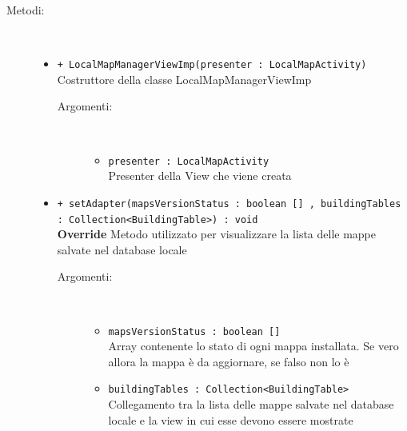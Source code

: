 \documentclass[../DefinizioneDiProdotto.tex]{subfiles}
\begin{document}
\begin{description}
\begin{itemize}
	\end{itemize}
	\item[Metodi:] \
	\begin{itemize}
		\item \texttt{+ LocalMapManagerViewImp(presenter : LocalMapActivity)}\\
		Costruttore della classe LocalMapManagerViewImp
		\begin{description}
			\item[Argomenti:] \
			\begin{itemize}
				\item \texttt{presenter : LocalMapActivity}\\
				Presenter della View che viene creata\end{itemize}
		\end{description}
		\item \texttt{+ setAdapter(mapsVersionStatus : boolean [] , buildingTables : Collection<BuildingTable>) : void}\\
		\textbf{Override} Metodo utilizzato per visualizzare la lista delle mappe salvate nel database locale
		\begin{description}
			\item[Argomenti:] \
			\begin{itemize}
				\item \texttt{mapsVersionStatus : boolean [] }\\
				Array contenente lo stato di ogni mappa installata. Se vero allora la mappa è da aggiornare, se falso non lo è\item \texttt{buildingTables : Collection<BuildingTable>}\\
				Collegamento tra la lista delle mappe salvate nel database locale e la view in cui esse devono essere mostrate\end{itemize}
		\end{description}
	\end{itemize}
\end{description}
\end{document}
